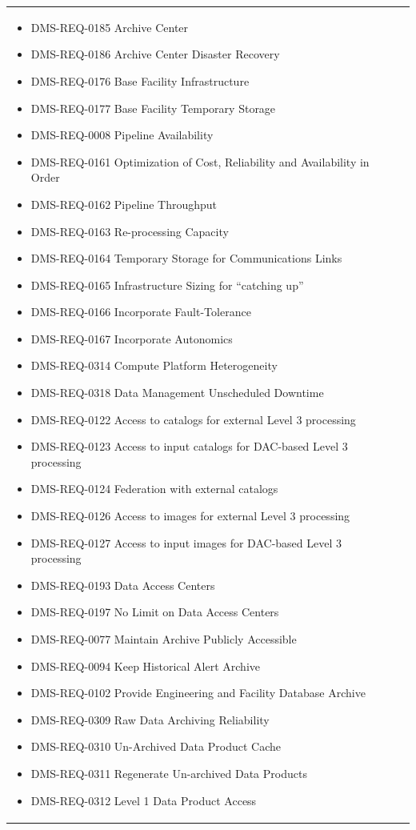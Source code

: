 \documentclass[DM,lsstdraft,toc]{lsstdoc}
\begin{document}
\begin{xtabular}{|p{0.1\textwidth}|p{0.85\textwidth}|}
\begin{itemize}
\item DMS-REQ-0185 Archive Center
\item DMS-REQ-0186 Archive Center Disaster Recovery
\item DMS-REQ-0176 Base Facility Infrastructure
\item DMS-REQ-0177 Base Facility Temporary Storage
\item DMS-REQ-0008 Pipeline Availability
\item DMS-REQ-0161 Optimization of Cost, Reliability and Availability in Order
\item DMS-REQ-0162 Pipeline Throughput
\item DMS-REQ-0163 Re-processing Capacity
\item DMS-REQ-0164 Temporary Storage for Communications Links
\item DMS-REQ-0165 Infrastructure Sizing for ``catching up''
\item DMS-REQ-0166 Incorporate Fault-Tolerance
\item DMS-REQ-0167 Incorporate Autonomics
\item DMS-REQ-0314 Compute Platform Heterogeneity
\item DMS-REQ-0318 Data Management Unscheduled Downtime
\item DMS-REQ-0122 Access to catalogs for external Level 3 processing
\item DMS-REQ-0123 Access to input catalogs for DAC-based Level 3 processing
\item DMS-REQ-0124 Federation with external catalogs
\item DMS-REQ-0126 Access to images for external Level 3 processing
\item DMS-REQ-0127 Access to input images for DAC-based Level 3 processing
\item DMS-REQ-0193 Data Access Centers
\item DMS-REQ-0197 No Limit on Data Access Centers
\item DMS-REQ-0077 Maintain Archive Publicly Accessible
\item DMS-REQ-0094 Keep Historical Alert Archive
\item DMS-REQ-0102 Provide Engineering and Facility Database Archive
\item DMS-REQ-0309 Raw Data Archiving Reliability
\item DMS-REQ-0310 Un-Archived Data Product Cache
\item DMS-REQ-0311 Regenerate Un-archived Data Products
\item DMS-REQ-0312 Level 1 Data Product Access

\end{itemize}
\end{xtabular}
\end{document}
